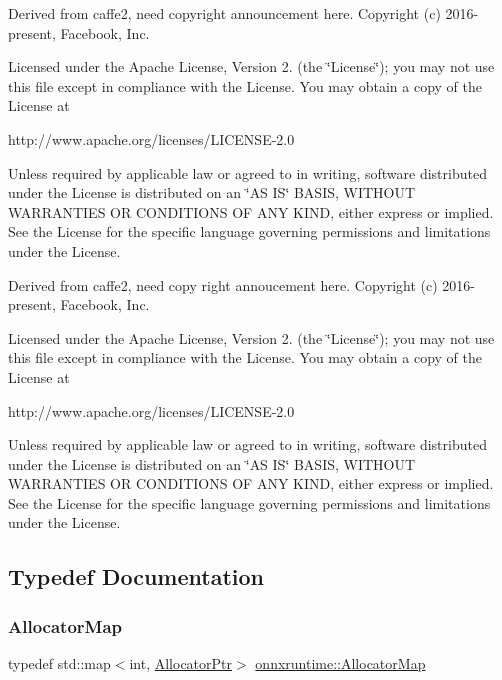 Derived from caffe2, need copyright announcement here. Copyright (c) 2016-\/present, Facebook, Inc.

Licensed under the Apache License, Version 2. (the \char`\"{}\+License\char`\"{}); you may not use this file except in compliance with the License. You may obtain a copy of the License at \begin{DoxyVerb}http://www.apache.org/licenses/LICENSE-2.0
\end{DoxyVerb}


Unless required by applicable law or agreed to in writing, software distributed under the License is distributed on an \char`\"{}\+A\+S I\+S\char`\"{} B\+A\+S\+IS, W\+I\+T\+H\+O\+UT W\+A\+R\+R\+A\+N\+T\+I\+ES OR C\+O\+N\+D\+I\+T\+I\+O\+NS OF A\+NY K\+I\+ND, either express or implied. See the License for the specific language governing permissions and limitations under the License.

Derived from caffe2, need copy right annoucement here. Copyright (c) 2016-\/present, Facebook, Inc.

Licensed under the Apache License, Version 2. (the \char`\"{}\+License\char`\"{}); you may not use this file except in compliance with the License. You may obtain a copy of the License at \begin{DoxyVerb}http://www.apache.org/licenses/LICENSE-2.0
\end{DoxyVerb}


Unless required by applicable law or agreed to in writing, software distributed under the License is distributed on an \char`\"{}\+A\+S I\+S\char`\"{} B\+A\+S\+IS, W\+I\+T\+H\+O\+UT W\+A\+R\+R\+A\+N\+T\+I\+ES OR C\+O\+N\+D\+I\+T\+I\+O\+NS OF A\+NY K\+I\+ND, either express or implied. See the License for the specific language governing permissions and limitations under the License. 

\subsection{Typedef Documentation}
\mbox{\label{namespaceonnxruntime_a1e552cdfa7d026fd643f9542b1037e92}} 
\subsubsection{\texorpdfstring{Allocator\+Map}{AllocatorMap}}
{\footnotesize\ttfamily typedef std\+::map$<$int, \mbox{\hyperlink{namespaceonnxruntime_a6cdac724c5dcefded3a63f08dae58fda}{Allocator\+Ptr}}$>$ \mbox{\hyperlink{namespaceonnxruntime_a1e552cdfa7d026fd643f9542b1037e92}{onnxruntime\+::\+Allocator\+Map}}}

